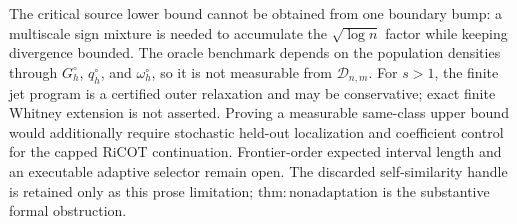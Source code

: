 The critical source lower bound cannot be obtained from one boundary bump: a multiscale sign mixture is needed to accumulate the \(\sqrt{\log n}\) factor while keeping divergence bounded. The oracle benchmark depends on the population densities through \(G_h^{\circ}\), \(q_h^{\circ}\), and \(\omega_h^{\circ}\), so it is not measurable from \(\mathcal D_{n,m}\). For \(s>1\), the finite jet program is a certified outer relaxation and may be conservative; exact finite Whitney extension is not asserted. Proving a measurable same-class upper bound would additionally require stochastic held-out localization and coefficient control for the capped RiCOT continuation. Frontier-order expected interval length and an executable adaptive selector remain open. The discarded self-similarity handle is retained only as this prose limitation; \(\mathrm{thm:nonadaptation}\) is the substantive formal obstruction.